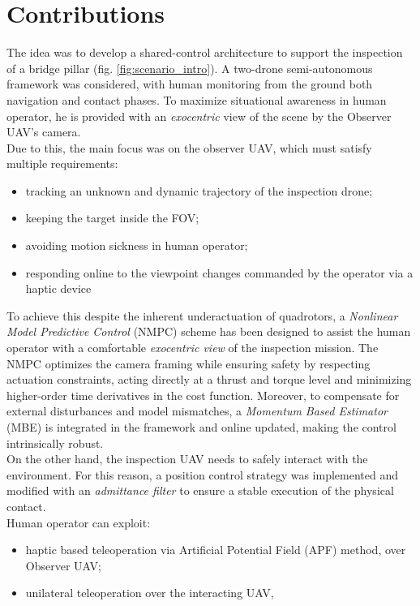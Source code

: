\section{Contributions}
The idea was to develop a shared-control architecture to support the inspection of a bridge pillar (fig. \ref{fig:scenario_intro}). A two-drone semi-autonomous framework was considered, with human monitoring from the ground both navigation and contact phases. To maximize situational awareness in human operator, he is provided with an \textit{exocentric} view of the scene by the Observer UAV's camera. 
\\Due to this, the main focus was on the observer UAV, which must satisfy multiple requirements:
\begin{itemize}
    \item tracking an unknown and dynamic trajectory of the inspection drone;
    \item keeping the target inside the FOV;
    \item avoiding motion sickness in human operator;
    \item responding online to the viewpoint changes commanded by the operator via a haptic device
\end{itemize}
To achieve this despite the inherent underactuation of quadrotors, a \textit{Nonlinear Model Predictive Control} (NMPC) scheme has been designed to assist the human operator with a comfortable \textit{exocentric view} of the inspection mission. The NMPC optimizes the camera framing while ensuring safety by respecting actuation constraints, acting directly at a thrust and torque level and minimizing higher-order time derivatives in the cost function. Moreover, to compensate for external disturbances and model mismatches, a \textit{Momentum Based Estimator} (MBE) is integrated in the framework and online updated, making the control intrinsically robust. 
\\On the other hand, the inspection UAV needs to safely interact with the environment. For this reason, a position control strategy was implemented and modified with an \textit{admittance filter} to ensure a stable execution of the physical contact.
\\Human operator can exploit:
\begin{itemize}
    \item haptic based teleoperation via Artificial Potential Field (APF) method, over Observer UAV;
    \item unilateral teleoperation over the interacting UAV,
\end{itemize}  
